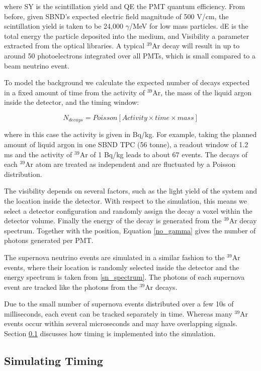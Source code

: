 \documentclass[a4paper]{article}
\begin{document}
\noindent where SY is the scintillation yield and QE the PMT quantum efficiency. From before, given SBND's expected electric field magnitude of 500 V/cm, the scintillation yield is taken to be 24,000 $\gamma$/MeV for low mass particles. dE is the total energy the particle deposited into the medium, and Visibility a parameter extracted from the optical libraries. A typical $^{39}$Ar decay will result in up to around 50 photoelectrons integrated over all PMTs, which is small compared to a beam neutrino event.

To model the background we calculate the expected number of decays expected in a fixed amount of time from the activity of $^{39}$Ar, the mass of the liquid argon inside the detector, and the timing window:

\begin{equation} \label{no_argon}
N_{decays} = Poisson[ Activity \times time \times mass]
\end{equation}

where in this case the activity is given in Bq/kg. For example, taking the planned amount of liquid argon in one SBND TPC (56 tonne), a readout window of 1.2 ms and the activity of $^{39}$Ar of 1 Bq/kg leads to about 67 events. The decays of each $^{39}$Ar atom are treated as independent and are fluctuated by a Poisson distribution.

The visibility depends on several factors, such as the light yield of the system and the location inside the detector. With respect to the simulation, this means we select a detector configuration and randomly assign the decay a voxel within the detector volume. Finally the energy of the decay is generated from the $^{39}$Ar decay spectrum. Together with the position, Equation \ref{no_gamma} gives the number of photons generated per PMT. 

The supernova neutrino events are simulated in a similar fashion to the $^{39}$Ar events, where their location is randomly selected inside the detector and the energy spectrum is taken from \ref{sn_spectrum}. The photons of each supernova event are tracked like the photons from the $^{39}$Ar decays.

Due to the small number of supernova events distributed over a few 10s of milliseconds, each event can be tracked separately in time. Whereas many $^{39}$Ar events occur within several microseconds and may have overlapping signals. Section \ref{sim_timing} discusses how timing is implemented into the simulation.

\subsection{Simulating Timing}\label{sim_timing}
\end{document}
